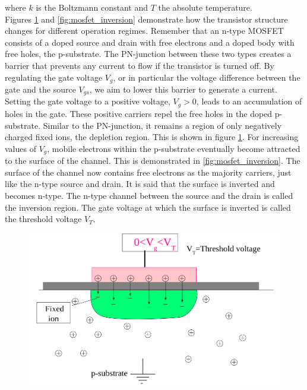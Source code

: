 where $k$ is the Boltzmann constant and $T$ the absolute temperature.\\

Figures \ref{fig:mosfet_depletion} and \ref{fig:mosfet_inversion} demonstrate how the transistor structure changes for different operation regimes. Remember that an n-type MOSFET consists of a doped source and drain with free electrons and a doped body with free holes, the p-substrate. The PN-junction between these two types creates a barrier that prevents any current to flow if the transistor is turned off. By regulating the gate voltage $V_g$, or in particular the voltage difference between the gate and the source $V_{gs}$, we aim to lower this barrier to generate a current. Setting the gate voltage to a positive voltage, $V_g > 0$, leads to an accumulation of holes in the gate. These positive carriers repel the free holes in the doped p-substrate. Similar to the PN-junction, it remains a region of only negatively charged fixed ions, the depletion region. This is shown in figure \ref{fig:mosfet_depletion}. For increasing values of $V_g$, mobile electrons within the p-substrate eventually become attracted to the surface of the channel. This is demonstrated in \ref{fig:mosfet_inversion}. The surface of the channel now contains free electrons as the majority carriers, just like the n-type source and drain. It is said that the surface is inverted and becomes n-type. The n-type channel between the source and the drain is called the inversion region. The gate voltage at which the surface is inverted is called the threshold voltage $V_T$.\\

\begin{figure}
    \centering
    \includegraphics[width=.8\linewidth]{Figures/mosfet_depletion.png}
    \caption{}
    \label{fig:mosfet_depletion}
\end{figure}

